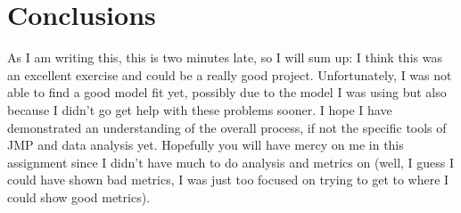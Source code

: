 \documentclass{article}
\begin{document}
\section{Conclusions}
As I am writing this, this is two minutes late, so I will sum up: I think this was an excellent exercise and could be a really good project. Unfortunately, I was not able to find a good model fit yet, possibly due to the model I was using but also because I didn't go get help with these problems sooner. I hope I have demonstrated an understanding of the overall process, if not the specific tools of JMP and data analysis yet. Hopefully you will have mercy on me in this assignment since I didn't have much to do analysis and metrics on (well, I guess I could have shown bad metrics, I was just too focused on trying to get to where I could show good metrics).
\end{document}
